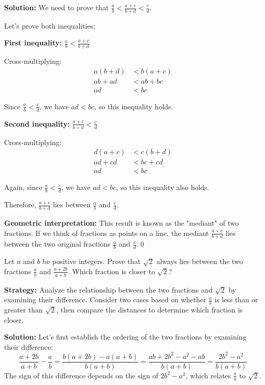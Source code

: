 \bigskip\noindent\textbf{Solution:}
We need to prove that $\frac{a}{b} < \frac{a + c}{b + d} < \frac{c}{d}$.

Let's prove both inequalities:

\textbf{First inequality:} $\frac{a}{b} < \frac{a + c}{b + d}$

Cross-multiplying:
\begin{align*}
a(b + d) &< b(a + c) \\
ab + ad &< ab + bc \\
ad &< bc
\end{align*}

Since $\frac{a}{b} < \frac{c}{d}$, we have $ad < bc$, so this inequality holds.

\textbf{Second inequality:} $\frac{a + c}{b + d} < \frac{c}{d}$

Cross-multiplying:
\begin{align*}
d(a + c) &< c(b + d) \\
ad + cd &< bc + cd \\
ad &< bc
\end{align*}

Again, since $\frac{a}{b} < \frac{c}{d}$, we have $ad < bc$, so this inequality also holds.

Therefore, $\frac{a + c}{b + d}$ lies between $\frac{a}{b}$ and $\frac{c}{d}$.

\textbf{Geometric interpretation:}
This result is known as the "mediant" of two fractions. If we think of fractions as points on a line, the mediant $\frac{a + c}{b + d}$ lies between the two original fractions $\frac{a}{b}$ and $\frac{c}{d}$.\qed


\begin{problembox}
\begin{problemstatement}
Let $a$ and $b$ be positive integers. Prove that $\sqrt{2}$ always lies between the two fractions $\frac{a}{b}$ and $\frac{a + 2b}{a + b}$. Which fraction is closer to $\sqrt{2}$?
\end{problemstatement}
\end{problembox}

\noindent\textbf{Strategy:} Analyze the relationship between the two fractions and $\sqrt{2}$ by examining their difference. Consider two cases based on whether $\frac{a}{b}$ is less than or greater than $\sqrt{2}$, then compare the distances to determine which fraction is closer.

\bigskip\noindent\textbf{Solution:}
Let's first establish the ordering of the two fractions by examining their difference:
\[
\frac{a + 2b}{a + b} - \frac{a}{b} = \frac{b(a + 2b) - a(a + b)}{b(a + b)} = \frac{ab + 2b^2 - a^2 - ab}{b(a + b)} = \frac{2b^2 - a^2}{b(a + b)}
\]
The sign of this difference depends on the sign of $2b^2 - a^2$, which relates $\frac{a}{b}$ to $\sqrt{2}$.

